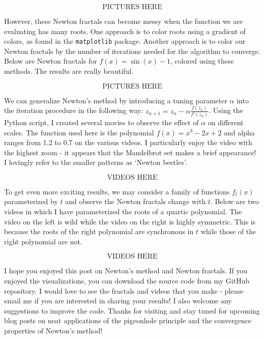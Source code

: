 \documentclass{book}
\begin{document}
$$ \text{PICTURES HERE} $$

However, these Newton fractals can become messy when the function we are evaluating has many roots. One approach is to color roots using a gradient of colors, as found in the \texttt{matplotlib} package. Another approach is to color our Newton fractals by the number of iterations needed for the algorithm to converge. Below are Newton fractals for $f(x) = \sin(x) - 1$, colored using these methods. The results are really beautiful.

$$ \text{PICTURES HERE} $$

We can generalize Newton's method by introducing a tuning parameter $\alpha$ into the iteration procedure in the following way: $z_{n+1} =  z_n - \alpha \frac{f(z_n)}{f'(z_n)}$. Using the Python script, I created several movies to observe the effect of $\alpha$ on different scales. The function used here is the polynomial $f(x) = x^3 - 2x + 2$ and alpha ranges from 1.2 to 0.7 on the various videos. I particularly enjoy the video with the highest zoom - it appears that the Mandelbrot set makes a brief appearance! I lovingly refer to the smaller patterns as `Newton beetles'.

$$ \text{VIDEOS HERE} $$

To get even more exciting results, we may consider a family of functions $f_t(x)$ parameterized by $t$ and observe the Newton fractals change with $t$. Below are two videos in which I have parameterized the roots of a quartic polynomial. The video on the left is wild while the video on the right is highly symmetric. This is because the roots of the right polynomial are synchronous in $t$ while those of the right polynomial are not.

$$ \text{VIDEOS HERE} $$

I hope you enjoyed this post on Newton's method and Newton fractals. If you enjoyed the visualizations, you can download the source code from my GitHub repository. I would love to see the fractals and videos that you make - please email me if you are interested in sharing your results! I also welcome any suggestions to improve the code. Thanks for visiting and stay tuned for upcoming blog posts on neat applications of the pigeonhole principle and the convergence properties of Newton's method!
\end{document}

